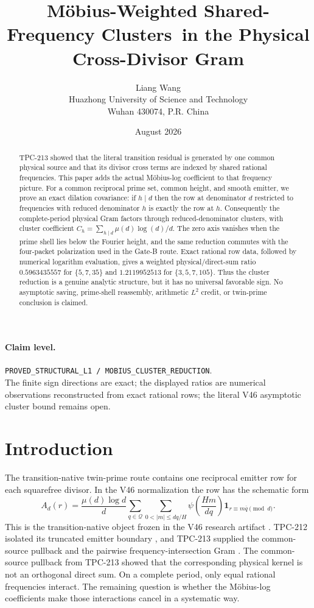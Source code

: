\documentclass[11pt]{article}
\title{\textbf{M\"obius-Weighted Shared-Frequency Clusters\ in the Physical Cross-Divisor Gram}}
\author{Liang Wang\\
Huazhong University of Science and Technology\\
Wuhan 430074, P.R. China}
\date{August 2026}
\theoremstyle{definition}
\theoremstyle{remark}
\newcommand{\one}{\mathbf 1}
\newcommand{\QQ}{\mathcal Q}
\newcommand{\muM}{\mu}
\begin{document}
\maketitle

\begin{abstract}
TPC-213 showed that the literal transition residual is generated by one common
physical source and that its divisor cross terms are indexed by shared rational
frequencies.  This paper adds the actual M\"obius-log coefficient to that
frequency picture.  For a common reciprocal prime set, common height, and
smooth emitter, we prove an exact dilation covariance: if $h\mid d$ then the
row at denominator $d$ restricted to frequencies with reduced denominator $h$
is exactly the row at $h$.  Consequently the complete-period physical Gram
factors through reduced-denominator clusters, with cluster coefficient
\(C_h=\sum_{h\mid d}\mu(d)\log(d)/d\).  The zero axis vanishes when the prime
shell lies below the Fourier height, and the same reduction commutes with the
four-packet polarization used in the Gate-B route.  Exact rational row data,
followed by numerical logarithm evaluation, gives a weighted physical/direct-sum ratio $0.5963435557$ for
$\{5,7,35\}$ and $1.2119952513$ for $\{3,5,7,105\}$.  Thus the cluster
reduction is a genuine analytic structure, but it has no universal favorable
sign.  No asymptotic saving, prime-shell reassembly, arithmetic $L^2$ credit, or
twin-prime conclusion is claimed.
\end{abstract}

\paragraph{Claim level.}
\texttt{PROVED\_STRUCTURAL\_L1 / MOBIUS\_CLUSTER\_REDUCTION}.\\
The finite sign directions are exact; the displayed ratios are numerical
observations reconstructed from exact rational rows;
the literal V46 asymptotic cluster bound remains open.

\section{Introduction}

The transition-native twin-prime route contains one reciprocal emitter row for
each squarefree divisor.  In the V46 normalization the row has the schematic
form
\begin{equation}
 A_d(r)=\frac{\muM(d)\log d}{d}
 \sum_{q\in\QQ}\sum_{0<|m|\le dq/H}
 \psi\!\left(\frac{Hm}{dq}\right)
 \one_{r\equiv m\overline q\pmod d}.
 \label{eq:v46-row}
\end{equation}
This is the transition-native object frozen in the V46 research artifact
\cite{WangV46}.  TPC-212 isolated its truncated emitter boundary
\cite{WangTPC212}, and TPC-213 supplied the common-source pullback and the
pairwise frequency-intersection Gram \cite{WangTPC213}.
The common-source pullback from TPC-213 showed that the corresponding physical
kernel is not an orthogonal direct sum.  On a complete period, only equal
rational frequencies interact.  The remaining question is whether the
M\"obius-log coefficients make those interactions cancel in a systematic way.
\end{document}
